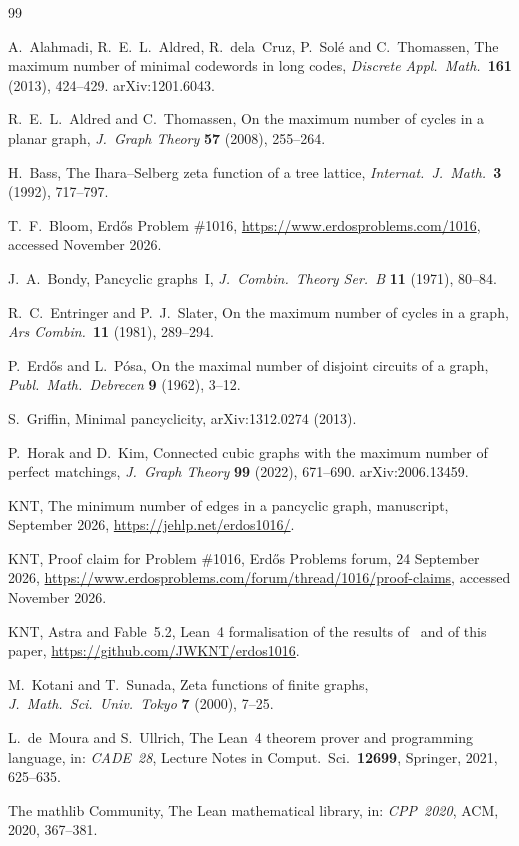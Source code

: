 \documentclass[11pt]{article}
\theoremstyle{definition}
\theoremstyle{remark}
\begin{document}
\begin{thebibliography}{99}\small

 A.~Alahmadi, R.~E.~L.~Aldred, R.~dela~Cruz, P.~Sol\'e and C.~Thomassen, The maximum
number of minimal codewords in long codes, \emph{Discrete Appl.\ Math.}\ \textbf{161} (2013),
424--429. arXiv:1201.6043.

 R.~E.~L.~Aldred and C.~Thomassen, On the maximum number of cycles in a planar graph,
\emph{J.~Graph Theory} \textbf{57} (2008), 255--264.

 H.~Bass, The Ihara--Selberg zeta function of a tree lattice, \emph{Internat.\
J.~Math.}\ \textbf{3} (1992), 717--797.

 T.~F.~Bloom, Erd\H{o}s Problem \#1016, \url{https://www.erdosproblems.com/1016},
accessed November 2026.

 J.~A.~Bondy, Pancyclic graphs~I, \emph{J.~Combin.\ Theory Ser.~B} \textbf{11}
(1971), 80--84.

 R.~C.~Entringer and P.~J.~Slater, On the maximum number of cycles in a graph,
\emph{Ars Combin.}\ \textbf{11} (1981), 289--294.

 P.~Erd\H{o}s and L.~P\'osa, On the maximal number of disjoint circuits of a graph,
\emph{Publ.\ Math.\ Debrecen} \textbf{9} (1962), 3--12.

 S.~Griffin, Minimal pancyclicity, arXiv:1312.0274 (2013).

 P.~Horak and D.~Kim, Connected cubic graphs with the maximum number of perfect
matchings, \emph{J.~Graph Theory} \textbf{99} (2022), 671--690. arXiv:2006.13459.

 KNT, The minimum number of edges in a pancyclic graph, manuscript, September 2026,
\url{https://jehlp.net/erdos1016/}.

 KNT, Proof claim for Problem \#1016, Erd\H{o}s Problems forum, 24 September 2026,
\url{https://www.erdosproblems.com/forum/thread/1016/proof-claims}, accessed November 2026.

 KNT, Astra and Fable~5.2, Lean~4 formalisation of the results of~\cite{KNT} and of
this paper, \url{https://github.com/JWKNT/erdos1016}.

 M.~Kotani and T.~Sunada, Zeta functions of finite graphs, \emph{J.~Math.\ Sci.\ Univ.\
Tokyo} \textbf{7} (2000), 7--25.

 L.~de~Moura and S.~Ullrich, The Lean~4 theorem prover and programming language,
in: \emph{CADE~28}, Lecture Notes in Comput.\ Sci.\ \textbf{12699}, Springer, 2021, 625--635.

\bibitem{Mathlib} The mathlib Community, The Lean mathematical library, in: \emph{CPP~2020}, ACM,
2020, 367--381.

\end{thebibliography}
\end{document}
